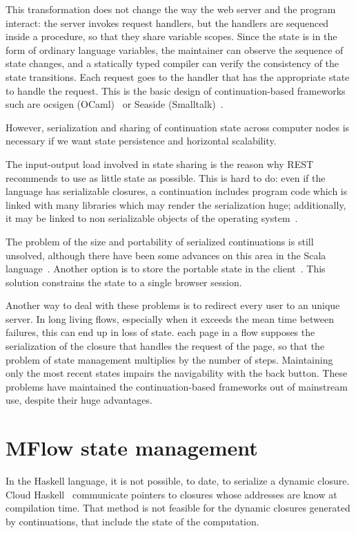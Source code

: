 \documentclass{tmr}
\begin{document}
This transformation does not change the way the web server and the program interact: the server invokes request handlers, but  the handlers are sequenced inside a procedure, so that they share variable scopes. Since the state is in the form of ordinary language variables, the maintainer can observe the sequence of state changes, and a statically typed compiler can verify the consistency of the state transitions. Each request goes to the handler that has the appropriate state to handle the request. This is the basic design of continuation-based frameworks such are ocsigen (OCaml)~\cite{auth:ocsigen} or Seaside (Smalltalk)~\cite{auth:seaside}. 
 
However, serialization  and sharing of continuation state across computer nodes is necessary if we want state persistence and horizontal scalability. 

The input-output load involved in state sharing is the reason why REST recommends to use as little state as possible. This is hard to do: even if the language has serializable closures, a continuation includes program code which is linked with many libraries which may render the serialization huge; additionally, it may be linked to non serializable objects of the operating system~\cite{oleg}. 

The problem of the size and portability of serialized continuations is still unsolved, although there have been some advances on this area in the Scala language~\cite{swarm}. Another option is to store the portable state in the client~\cite{McCarthy:2009:ARW:1631687.1596594}. This solution constrains the state to a single browser session. 
 
Another way to deal with these problems is to redirect every user to an unique server. In long living flows, especially when it exceeds the mean time between failures, this can end up in loss of state. each page in a flow supposes the serialization of the closure that handles the request of the page, so that the problem of state management multiplies by the number of steps. Maintaining only the most recent states impairs the navigability with the back button. These problems have maintained the continuation-based frameworks out of  mainstream use, despite their huge advantages. 
 
 
\section{ MFlow state management} 
 
In the Haskell language, it is not possible, to date, to serialize a dynamic closure. Cloud Haskell~\cite{auth:staticpackage} communicate pointers to closures whose addresses are know at compilation time. That method is not feasible for the dynamic closures generated by continuations, that include the state of the computation. 
\end{document}

